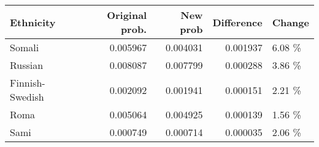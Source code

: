 \begin{tabular}{lrrrl}
\toprule
      Ethnicity &  Original prob. &  New prob &  Difference & Change \\
\midrule
         Somali &        0.005967 &  0.004031 &    0.001937 & 6.08 \% \\
        Russian &        0.008087 &  0.007799 &    0.000288 & 3.86 \% \\
Finnish-Swedish &        0.002092 &  0.001941 &    0.000151 & 2.21 \% \\
           Roma &        0.005064 &  0.004925 &    0.000139 & 1.56 \% \\
           Sami &        0.000749 &  0.000714 &    0.000035 & 2.06 \% \\
\bottomrule
\end{tabular}
